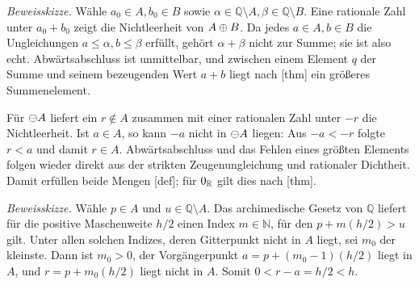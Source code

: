 \documentclass[main.tex]{subfiles}
\begin{document}

\emph{Beweisskizze.}
Wähle \(a_0\in A,b_0\in B\) sowie
\(\alpha\in\mathbb Q\setminus A,\beta\in\mathbb Q\setminus B\). Eine
rationale Zahl unter \(a_0+b_0\) zeigt die Nichtleerheit von
\(A\mathbin{\oplus} B\). Da jedes \(a\in A,b\in B\) die Ungleichungen
\(a\leq\alpha,b\leq\beta\) erfüllt, gehört \(\alpha+\beta\) nicht zur Summe;
sie ist also echt. Abwärtsabschluss ist unmittelbar, und zwischen einem
Element \(q\) der Summe und seinem bezeugenden Wert \(a+b\) liegt nach
[thm] ein größeres Summenelement.

Für \(\mathop{\ominus}\!A\) liefert ein \(r\notin A\) zusammen mit einer rationalen
Zahl unter \(-r\) die Nichtleerheit. Ist \(a\in A\), so kann \(-a\) nicht in
\(\mathop{\ominus}\!A\) liegen: Aus \(-a<-r\) folgte \(r<a\) und damit \(r\in A\).
Abwärtsabschluss und das Fehlen eines größten Elements folgen wieder direkt
aus der strikten Zeugenungleichung und rationaler Dichtheit. Damit erfüllen
beide Mengen [def]; für \(0_{\mathbb R}\)
gilt dies nach [thm].


\emph{Beweisskizze.}
Wähle \(p\in A\) und \(u\in\mathbb Q\setminus A\). Das archimedische
Gesetz von \(\mathbb Q\) liefert für die positive Maschenweite \(h/2\) einen
Index \(m\in\mathbb N\), für den \(p+m(h/2)>u\) gilt. Unter allen solchen
Indizes, deren Gitterpunkt nicht in \(A\) liegt, sei \(m_0\) der kleinste.
Dann ist \(m_0>0\), der Vorgängerpunkt
\(a=p+(m_0-1)(h/2)\) liegt in \(A\), und
\(r=p+m_0(h/2)\) liegt nicht in \(A\). Somit
\(0<r-a=h/2<h\).

\end{document}
